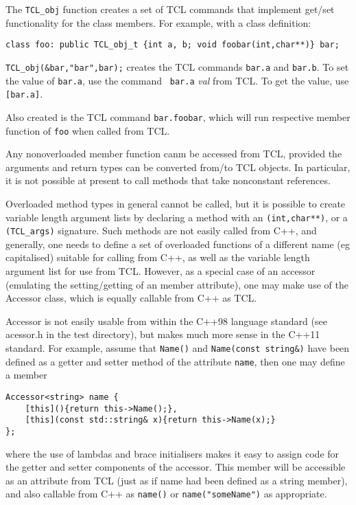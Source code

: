 The {\tt TCL\_obj} function creates a set of TCL commands that
implement get/set functionality for the class members. For example,
with a class definition:
\begin{verbatim}
class foo: public TCL_obj_t {int a, b; void foobar(int,char**)} bar;
\end{verbatim}
\verb+TCL_obj(&bar,"bar",bar);+ creates the TCL commands {\tt bar.a}
and {\tt bar.b}. To set the value of {\tt bar.a}, use the command {\tt
  bar.a} {\em val} from TCL. To get the value, use {\tt [bar.a]}.

Also created is the TCL command {\tt bar.foobar}, which will run
respective member function of {\tt foo} when called from TCL.

Any nonoverloaded member function canm be accessed from TCL, provided
the arguments and return types can be converted from/to TCL
objects. In particular, it is not possible at present to call methods
that take nonconstant references.

Overloaded method types in general cannot be called, but it is
possible to create variable length argument lists by declaring a
method with an \verb+(int,char**)+, or a \verb+(TCL_args)+
signature. Such methods are not easily called from C++, and generally,
one needs to define a set of overloaded functions of a different name
(eg capitalised) suitable for calling
from C++, as well as the variable length argument list for use from
TCL. However, as a special case of an accessor (emulating the
setting/getting of an member attribute), one may make use of the
Accessor class, which is equally callable from C++ as
TCL.

Accessor is not easily usable from within the C++98 language standard
(see acessor.h in the test directory), but makes much more sense in
the C++11 standard. For example, assume that \verb+Name()+ and
\verb+Name(const string&)+ have been defined as a getter and setter
method of the attribute \verb+name+, then one may define a member
\begin{verbatim}
Accessor<string> name {
    [this](){return this->Name();}, 
    [this](const std::string& x){return this->Name(x);}
};
\end{verbatim}
where the use of lambdas and brace initialisers makes it easy to
assign code for the getter and setter components of the accessor. This
member will be accessible as an attribute from TCL (just as if name
had been defined as a string member), and also callable from C++ as
\verb+name()+ or \verb+name("someName")+ as appropriate.

